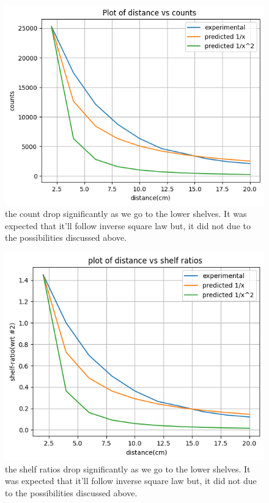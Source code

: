 \documentclass[twocolumn]{article}
\begin{document}
  
\begin{center}
\begin{figure}[h!]
\includegraphics[scale=0.6]{lab6_a.png}
\caption{\small{the count drop significantly as we go to the lower shelves. It was expected that it'll follow inverse square law but, it did not due to the possibilities discussed above.}}
\end{figure}
\begin{figure}[h!]
\includegraphics[scale=0.6]{lab6_b.png}
\caption{\small{the shelf ratios drop significantly as we go to the lower shelves. It was expected that it'll follow inverse square law but, it did not due to the possibilities discussed above.}}
\end{figure}
\end{center}
\end{document}
